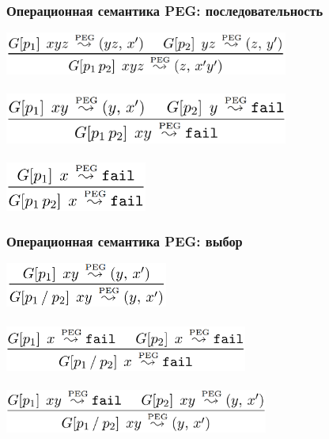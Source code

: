 \documentclass{beamer}
\begin{document}
\begin{frame}[fragile]
  \transwipe[direction=90]
  \frametitle{Операционная семантика PEG: последовательность}
\begin{center}
  \includegraphics[width=0.7\textwidth]{pics/con1}  \\~\\     \pause
  \includegraphics[width=0.7\textwidth]{pics/con2}  \\~\\     \pause
  \includegraphics[width=0.35\textwidth]{pics/con3}
\end{center}
\end{frame}

\begin{frame}[fragile]
  \transwipe[direction=90]
  \frametitle{Операционная семантика PEG: выбор}
\begin{center}
  \includegraphics[width=0.4\textwidth]{pics/ord1}  \\~\\     \pause
  \includegraphics[width=0.6\textwidth]{pics/ord2}  \\~\\     \pause
  \includegraphics[width=0.65\textwidth]{pics/ord3}
\end{center}
\end{frame}
\end{document}
